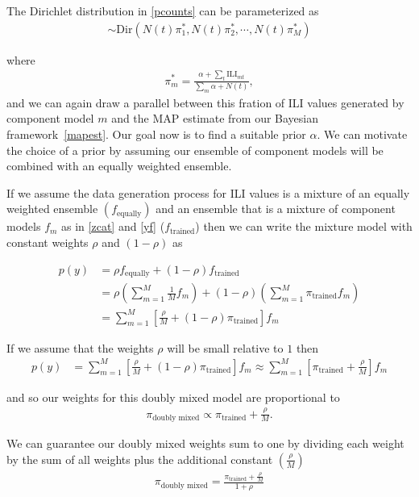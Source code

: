 \documentclass[sagev,times,Review,10pt]{sagej}
\def\l{\left}
\def\r{\right}
\newcommand{\f}{\frac}
\begin{document}
The Dirichlet distribution in \eqref{pcounts} can be parameterized as
\begin{align}
  [\theta_{1},\theta_{2},\cdots,\theta_{M}] \sim \text{Dir}\l( N(t) \pi^{*}_{1},  N(t) \pi^{*}_{2}, \cdots,  N(t) \pi^{*}_{M}\r)
\end{align}

where
\begin{align}
  \pi^{*}_{m} = \f{ \alpha + \sum_{t} \text{ILI}_{mt} }{\sum_{m}\alpha + N(t)},
\end{align}
and we can again draw a parallel between this fration of ILI values generated by component model $m$ and the MAP estimate from our Bayesian framework~\eqref{mapest}.
Our goal now is to find a suitable prior $\alpha$.
We can motivate the choice of a prior by assuming our ensemble of component models will be combined with an equally weighted ensemble.


If we assume the data generation process for ILI values is a mixture of an equally weighted ensemble $(f_{\text{equally}})$ and an ensemble that is a mixture of component models $f_{m}$ as in \eqref{zcat} and \eqref{yf} ($f_{\text{trained}}$) then we can write the mixture model with constant weights $\rho$ and $(1-\rho)$ as

\begin{align*}
  p(y) &= \rho f_{\text{equally}} + (1-\rho)f_{\text{trained}}\\
       &= \rho \l( \sum_{m=1}^{M} \f{1}{M} f_{m} \r) + (1-\rho) \l( \sum_{m=1}^{M} \pi_{\text{trained}} f_{m} \r) \\
       &= \sum_{m=1}^{M} \l[ \f{\rho}{M} + (1-\rho) \pi_{\text{trained}} \r] f_{m}
\end{align*}

If we assume that the weights $\rho$ will be small relative to $1$ then
\begin{align*}
  p(y) &= \sum_{m=1}^{M} \l[ \f{\rho}{M} + (1-\rho) \pi_{\text{trained}} \r] f_{m}  \approx \sum_{m=1}^{M} \l[ \pi_{\text{trained}} + \f{\rho}{M} \r] f_{m}
\end{align*}

and so our weights for this doubly mixed model are proportional to 
\begin{align}
  \pi_{\text{doubly mixed}} \propto \pi_{\text{trained}} + \f{\rho}{M}.
\end{align}

We can guarantee our doubly mixed weights sum to one by dividing each weight by the sum of all weights plus the additional constant $(\f{\rho}{M})$
\begin{align}
  \pi_{\text{doubly mixed}}  =  \f{\pi_{\text{trained}} + \f{\rho}{M}}{1 + \rho}
\end{align}
\end{document}
